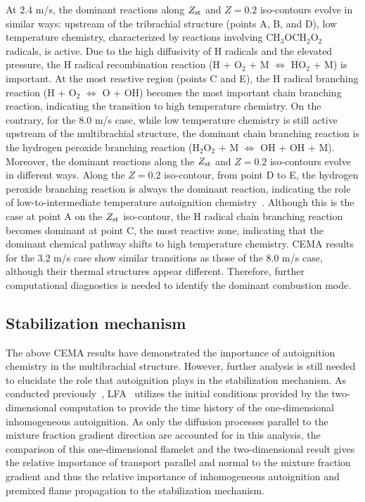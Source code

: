 \documentclass[review,3p,times]{elsarticle}
\begin{document}
At $2.4$ m/s, the dominant reactions along $Z_{\rm st}$ and $Z = 0.2$ iso-contours evolve in similar ways: upstream of the tribrachial structure (points A, B, and D), low temperature chemistry, characterized by reactions involving CH$_3$OCH$_2$O$_2$ radicals, is active.  Due to the high diffusivity of H radicals and the elevated pressure, the H radical recombination reaction (H + O$_2$ + M $\Longleftrightarrow$ HO$_2$ + M) is important.  At the most reactive region (points C and E), the H radical branching reaction (H + O$_2$ $\Longleftrightarrow$ O + OH) becomes the most important chain branching reaction, indicating the transition to high temperature chemistry.  On the contrary, for the $8.0$ m/s case, while low temperature chemistry is still active upstream of the multibrachial structure, the dominant chain branching reaction is the hydrogen peroxide branching reaction (H$_2$O$_2$ + M $\Longleftrightarrow$ OH + OH + M).  Moreover, the dominant reactions along the $Z_{\rm st}$ and $Z = 0.2$ iso-contours evolve in different ways.  Along the $Z = 0.2$ iso-contour, from point D to E, the hydrogen peroxide branching reaction is always the dominant reaction, indicating the role of low-to-intermediate temperature autoignition chemistry~\cite{westbrook00}.  Although this is the case at point A on the $Z_{\rm st}$ iso-contour, the H radical chain branching reaction becomes dominant at point C, the most reactive zone, indicating that the dominant chemical pathway shifts to high temperature chemistry.  CEMA results for the $3.2$ m/s case show similar transitions as those of the $8.0$ m/s case, although their thermal structures appear different.  Therefore, further computational diagnostics is needed to identify the dominant combustion mode.   

\subsection{Stabilization mechanism} 
The above CEMA results have demonstrated the importance of autoignition chemistry in the multibrachial structure.  However, further analysis is still needed to elucidate the role that autoignition plays in the stabilization mechanism.  As conducted previously~\cite{deng15}, LFA~\cite{pitsch98a} utilizes the initial conditions provided by the two-dimensional computation to provide the time history of the one-dimensional inhomogeneous autoignition.  As only the diffusion processes parallel to the mixture fraction gradient direction are accounted for in this analysis, the comparison of this one-dimensional flamelet and the two-dimensional result gives the relative importance of transport parallel and normal to the mixture fraction gradient and thus the relative importance of inhomogeneous autoignition and premixed flame propagation to the stabilization mechanism.
\end{document}
